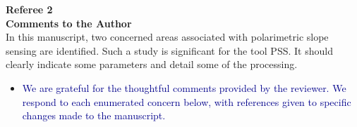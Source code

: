 \documentclass[14pt,letterpaper]{article}
\begin{document}
\newpage

\noindent \textbf{Referee 2}\\

\textbf{Comments to the Author}\\
In this manuscript, two concerned areas associated with polarimetric slope sensing are identified. Such a study is significant for the tool PSS. It should clearly indicate some parameters and detail some of the processing.
\begin{itemize}
    \item \textcolor{darkblue}{We are grateful for the thoughtful comments provided by the reviewer. We respond to each enumerated concern below, with references given to specific changes made to the manuscript.}
\end{itemize}

\end{document}
